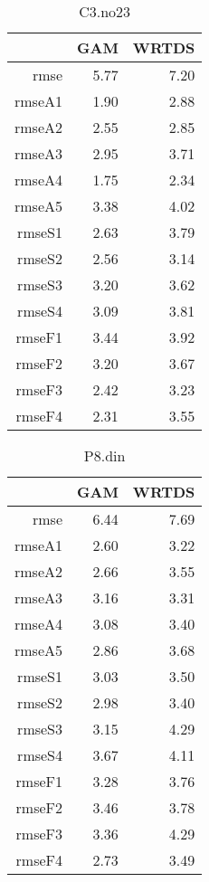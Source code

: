 \documentclass[12pt]{amsart}
\begin{document}
\begin{table}[H]
\centering
\begin{tabular}{rrr}
  \hline
 & GAM & WRTDS \\ 
  \hline
rmse & 5.77 & 7.20 \\ 
  rmseA1 & 1.90 & 2.88 \\ 
  rmseA2 & 2.55 & 2.85 \\ 
  rmseA3 & 2.95 & 3.71 \\ 
  rmseA4 & 1.75 & 2.34 \\ 
  rmseA5 & 3.38 & 4.02 \\ 
  rmseS1 & 2.63 & 3.79 \\ 
  rmseS2 & 2.56 & 3.14 \\ 
  rmseS3 & 3.20 & 3.62 \\ 
  rmseS4 & 3.09 & 3.81 \\ 
  rmseF1 & 3.44 & 3.92 \\ 
  rmseF2 & 3.20 & 3.67 \\ 
  rmseF3 & 2.42 & 3.23 \\ 
  rmseF4 & 2.31 & 3.55 \\ 
   \hline
\end{tabular}
\caption{C3.no23}
\end{table}

\begin{table}[H]
\centering
\begin{tabular}{rrr}
  \hline
 & GAM & WRTDS \\ 
  \hline
rmse & 6.44 & 7.69 \\ 
  rmseA1 & 2.60 & 3.22 \\ 
  rmseA2 & 2.66 & 3.55 \\ 
  rmseA3 & 3.16 & 3.31 \\ 
  rmseA4 & 3.08 & 3.40 \\ 
  rmseA5 & 2.86 & 3.68 \\ 
  rmseS1 & 3.03 & 3.50 \\ 
  rmseS2 & 2.98 & 3.40 \\ 
  rmseS3 & 3.15 & 4.29 \\ 
  rmseS4 & 3.67 & 4.11 \\ 
  rmseF1 & 3.28 & 3.76 \\ 
  rmseF2 & 3.46 & 3.78 \\ 
  rmseF3 & 3.36 & 4.29 \\ 
  rmseF4 & 2.73 & 3.49 \\ 
   \hline
\end{tabular}
\caption{P8.din}
\end{table}
\end{document}
